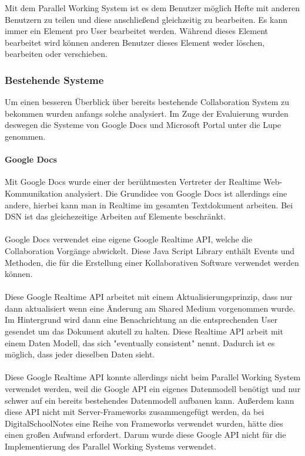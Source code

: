 Mit dem Parallel Working System ist es dem Benutzer möglich Hefte mit anderen Benutzern zu teilen und diese anschließend gleichzeitig zu bearbeiten. Es kann immer ein Element pro User bearbeitet werden. Während dieses Element bearbeitet wird können anderen Benutzer dieses Element weder löschen, bearbeiten oder verschieben. 
\subsubsection{Bestehende Systeme}
Um einen besseren Überblick über bereits bestehende Collaboration System zu bekommen wurden anfangs solche analysiert. Im Zuge der Evaluierung wurden deswegen die Systeme von Google Docs und Microsoft Portal unter die Lupe genommen.
\paragraph{Google Docs}
Mit Google Docs wurde einer der berühtmesten Vertreter der Realtime Web-Kommunikation analysiert. Die Grundidee von Google Docs ist allerdings eine andere, hierbei kann man in Realtime im gesamten Textdokument arbeiten. Bei DSN ist das gleichezeitige Arbeiten auf Elemente beschränkt.\\
\\
Google Docs verwendet eine eigene Google Realtime API, welche die Collaboration Vorgänge abwickelt. Diese Java Script Library enthält Events und Methoden, die für die Erstellung einer Kollaborativen Software verwendet werden können.\\
\\
Diese Google Realtime API arbeitet mit einem Aktualisierungsprinzip, dass nur dann aktualisiert wenn eine Änderung am Shared Medium vorgenommen wurde. Im Hintergrund wird dann eine Benachrichtung an die entsprechenden User gesendet um das Dokument akutell zu halten. Diese Realtime API arbeit mit einem Daten Modell, das sich "eventually consistent" nennt. Dadurch ist es möglich, dass jeder dieselben Daten sieht.\cite{GOOGLE}\\
\\
Diese Google Realtime API konnte allerdings nicht beim Parallel Working System verwendet werden, weil die Google API ein eigenes Datenmodell benötigt und nur schwer auf ein bereits bestehendes Datenmodell aufbauen kann. Außerdem kann diese API nicht mit Server-Frameworks zusammengefügt werden, da bei DigitalSchoolNotes eine Reihe von Frameworks verwendet wurden, hätte dies einen großen Aufwand erfordert. Darum wurde diese Google API nicht für die Implementierung des Parallel Working Systems verwendet.\\\\
